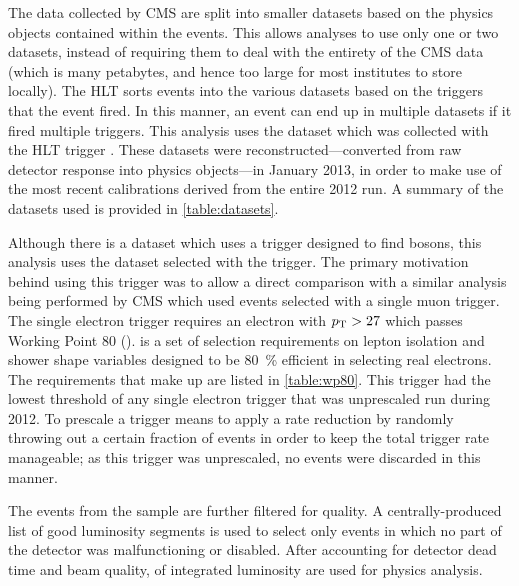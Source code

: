The data collected by CMS are split into smaller datasets based on the physics
objects contained within the events. This allows analyses to use only one or
two datasets, instead of requiring them to deal with the entirety of the CMS
data (which is many petabytes, and hence too large for most institutes to store
locally). The HLT sorts events into the various datasets based on the triggers
that the event fired. In this manner, an event can end up in multiple datasets
if it fired multiple triggers. This analysis uses the \SingleElectron dataset
which was collected with the HLT trigger \SingleElectronTrigger. These datasets
were reconstructed---converted from raw detector response into physics
objects---in January 2013, in order to make use of the most recent
calibrations derived from the entire 2012 run. A summary of the datasets used
is provided in \cref{table:datasets}.



Although there is a \DoubleElectron dataset which uses a trigger designed to
find \Z bosons, this analysis uses the \SingleElectron dataset selected with
the \SingleElectronTrigger trigger. The primary motivation behind using this
trigger was to allow a direct comparison with a similar \phistar analysis being
performed by CMS which used \Ztomumu events selected with a single muon
trigger. The single electron trigger requires an electron with $p_{\mathrm{T}} > 27$ which
passes Working Point 80 (\WPEighty). \WPEighty is a set of selection
requirements on lepton isolation and shower shape variables designed to be
\SI{80}{\percent} efficient in selecting real electrons. The requirements that
make up \WPEighty are listed in \cref{table:wp80}. This trigger had the lowest
\pt threshold of any single electron trigger that was unprescaled run during
2012. To prescale a trigger means to apply a rate reduction by randomly
throwing out a certain fraction of events in order to keep the total trigger
rate manageable; as this trigger was unprescaled, no events were discarded in
this manner.



The events from the \SingleElectron sample are further filtered for quality. A
centrally-produced list of good luminosity segments is used to select only
events in which no part of the detector was malfunctioning or disabled. After
accounting for detector dead time and beam quality, \GoodLumiNumber of
integrated luminosity are used for physics analysis.

